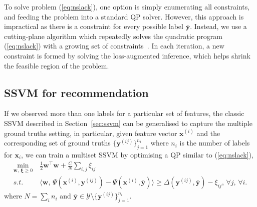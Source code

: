 

To solve problem (\ref{eq:nslack}), one option is simply enumerating all constraints, and feeding the problem into a standard QP solver.
However, this approach is impractical as there is a constraint for every possible label $\bar{\mathbf{y}}$.
Instead, we use a cutting-plane algorithm which repeatedly solves the quadratic program (\ref{eq:nslack}) 
with a growing set of constraints~\cite{joachims2009predicting}.
In each iteration, a new constraint is formed by solving the loss-augmented inference, 
which helps shrink the feasible region of the problem.


\subsection{SSVM for recommendation}
\label{ssec:sr}


If we observed more than one labels for a particular set of features, 
the classic SSVM described in Section~\ref{sec:ssvm} can be generalised to capture the multiple ground truths setting,
in particular, given feature vector $\mathbf{x}^{(i)}$ and the corresponding set of ground truths $\{\mathbf{y}^{(ij)}\}_{j=1}^{n_i}$ 
where $n_i$ is the number of labels for $\mathbf{x}_i$,
we can train a multiset SSVM by optimising a QP similar to (\ref{eq:nslack}),
\begin{equation}
\label{eq:nslack_ml}
\begin{aligned}
\min_{\mathbf{w}, \, \bm{\xi} \ge 0} ~& \frac{1}{2} \mathbf{w}^\top \mathbf{w} + \frac{C}{N} \sum_{i,j} \xi_{ij} \\
s.t.~ ~& \langle \mathbf{w}, \, \Psi(\mathbf{x}^{(i)}, \mathbf{y}^{(ij)}) - \Psi(\mathbf{x}^{(i)}, \bar{\mathbf{y}}) \rangle \ge 
         \Delta(\mathbf{y}^{(ij)}, \bar{\mathbf{y}}) - \xi_{ij}, \, \forall j, \, \forall i.
\end{aligned}
\end{equation}
where $N = \sum_i n_i$ and $\bar{\mathbf{y}} \in \mathcal{Y} \setminus \{\mathbf{y}^{(ij)}\}_{j=1}^{n_i}$.



